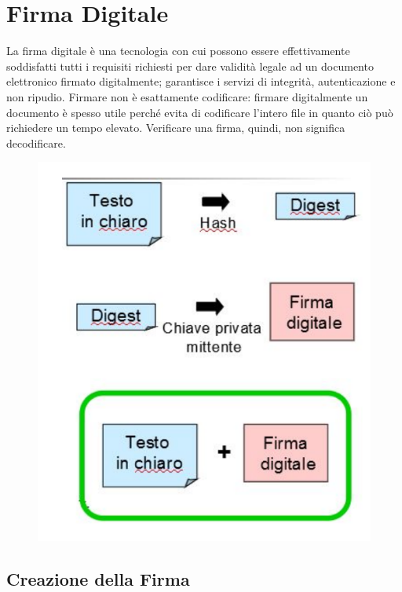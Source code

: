 \section{Firma Digitale}

La firma digitale è una tecnologia con cui possono essere
effettivamente soddisfatti tutti i requisiti richiesti per dare validità
legale ad un documento elettronico firmato digitalmente;
garantisce i servizi di integrità, autenticazione e non ripudio.
Firmare non è esattamente codificare: firmare digitalmente un documento è spesso
utile perché evita di
codificare l'intero file in quanto ciò può richiedere un
tempo elevato. Verificare una firma, quindi, non significa
decodificare.

\begin{figure}[H]
    \centering
    \includegraphics[width=\textwidth, keepaspectratio]{capitoli/crittografia/imgs/firmad.png}
\end{figure}

\subsection{Creazione della Firma}

